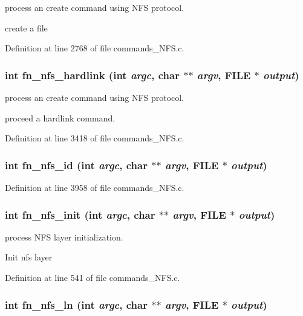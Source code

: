 process an create command using NFS protocol.

create a file 

Definition at line 2768 of file commands\_\-NFS.c.
\subsubsection[{fn\_\-nfs\_\-hardlink}]{\setlength{\rightskip}{0pt plus 5cm}int fn\_\-nfs\_\-hardlink (int {\em argc}, \/  char $\ast$$\ast$ {\em argv}, \/  FILE $\ast$ {\em output})}\label{commands_8h_c99922021c335b7fba99edb49a2c096c}


process an create command using NFS protocol.

proceed a hardlink command. 

Definition at line 3418 of file commands\_\-NFS.c.
\subsubsection[{fn\_\-nfs\_\-id}]{\setlength{\rightskip}{0pt plus 5cm}int fn\_\-nfs\_\-id (int {\em argc}, \/  char $\ast$$\ast$ {\em argv}, \/  FILE $\ast$ {\em output})}\label{commands_8h_e82413f9ea4aee4e5004e68864d9d9e0}




Definition at line 3958 of file commands\_\-NFS.c.
\subsubsection[{fn\_\-nfs\_\-init}]{\setlength{\rightskip}{0pt plus 5cm}int fn\_\-nfs\_\-init (int {\em argc}, \/  char $\ast$$\ast$ {\em argv}, \/  FILE $\ast$ {\em output})}\label{commands_8h_3888e7f1af730319f7a0ff8b28a2268f}


process NFS layer initialization.

Init nfs layer 

Definition at line 541 of file commands\_\-NFS.c.
\subsubsection[{fn\_\-nfs\_\-ln}]{\setlength{\rightskip}{0pt plus 5cm}int fn\_\-nfs\_\-ln (int {\em argc}, \/  char $\ast$$\ast$ {\em argv}, \/  FILE $\ast$ {\em output})}\label{commands_8h_c030f04189dccaf1c907d78c250c0ea0}


